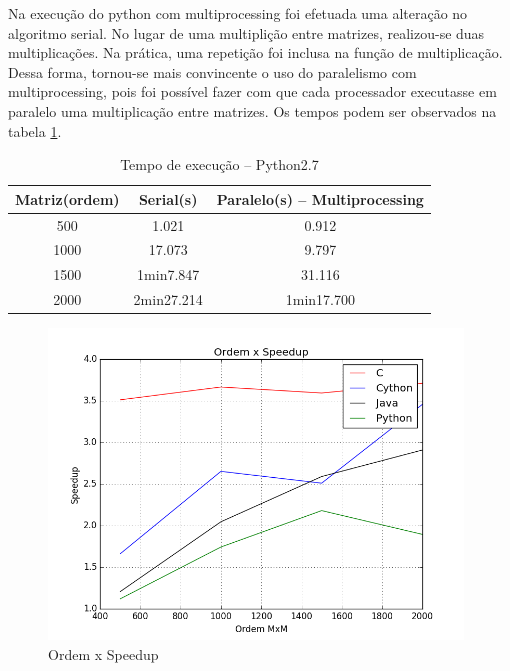 \documentclass[a4paper,12pt]{article}
\begin{document}


Na execução do python com multiprocessing foi efetuada uma alteração no algoritmo serial. No lugar de uma multiplição entre matrizes, realizou-se duas multiplicações. Na prática, uma repetição foi inclusa na função de multiplicação. Dessa forma, tornou-se mais convincente o uso do paralelismo com multiprocessing, pois foi possível fazer com que cada processador executasse em paralelo uma multiplicação entre matrizes. Os tempos podem ser observados na tabela \ref{tab:timePy2}. 

\begin{table}[H]
  \centering
  \caption{Tempo de execução -- Python2.7}
  \begin{tabular}{ccc}
    \hline
    Matriz(ordem) & Serial(s) & Paralelo(s) -- Multiprocessing \\
    \hline
    \hline
    500 & 1.021 &  0.912 \\
    1000 & 17.073 & 9.797\\
    1500 & 1min7.847 & 31.116\\
    2000 & 2min27.214 & 1min17.700\\
    \hline
  \end{tabular}
  \label{tab:timePy2}
\end{table}



\begin{figure}[H]
  \centering
  \includegraphics[width=11.0cm]{pictures/speedup_full2.png}
  \caption{Ordem x Speedup}
\label{fig:speedup_full}
\end{figure}
\end{document}

